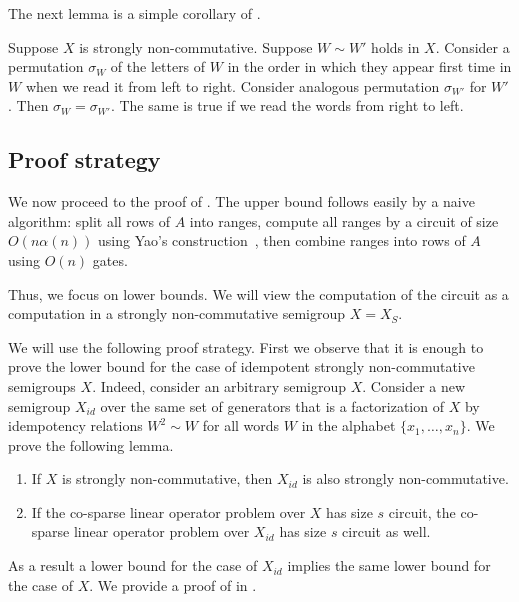 \documentclass{toc}
\begin{document}
The next lemma is a simple corollary of .
\begin{lemma} \label{lem:variables_order}
Suppose $X$ is strongly non-commutative. Suppose $W \sim W'$ holds in $X$. Consider a permutation $\sigma_W$ of the letters of $W$ in the order in which they appear first time in $W$ when we read it from left to right. Consider analogous permutation $\sigma_{W'}$ for $W'$. Then $\sigma_W = \sigma_{W'}$.
%
The same is true if we read the words from right to left.

\end{lemma}

\subsection{Proof strategy}


We now proceed to the proof of . The upper bound
follows easily by a naive algorithm: split all rows of $A$ into ranges, compute
all ranges by a circuit of size $O(n\alpha(n))$ using Yao's
construction~\cite{DBLP:conf/stoc/Yao82}, then combine ranges into rows of $A$
using $O(n)$ gates.

Thus, we focus on lower bounds. We will view the computation of the circuit as a
computation in a strongly non-commutative semigroup $X=X_S$.

We will use the following proof strategy. First we observe that it is enough to
prove the lower bound for the case of idempotent strongly non-commutative
semigroups $X$. Indeed,
consider an arbitrary semigroup $X$. Consider a new semigroup $X_{id}$ over the same set of generators that is a factorization of $X$ by idempotency relations $W^2\sim W$ for all words $W$ in the alphabet $\{x_1,\ldots, x_n\}$.
%
We prove the following lemma.
\begin{lemma} \label{lem:idempotent_is_hardest}
	\begin{enumerate}
\item If $X$ is strongly non-commutative, then $X_{id}$ is also strongly non-commutative.
		\item If the
        co-sparse
        linear operator problem over $X$ has size $s$
		circuit, the
        co-sparse
        linear operator problem over $X_{id}$ has size
		$s$ circuit as well.
	\end{enumerate}
\end{lemma}
As a result a lower bound for the case of $X_{id}$ implies the same lower bound for the case of $X$.
We provide a proof of  in
.
\end{document}
